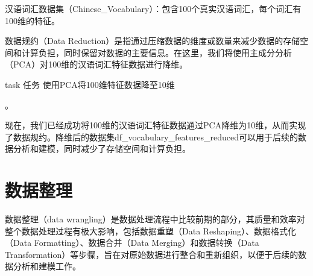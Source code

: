\documentclass[]{book}
\newenvironment{Shaded}{\begin{snugshade}}{\end{snugshade}}
\newcommand{\CommentTok}[1]{\textcolor[rgb]{0.56,0.35,0.01}{\textit{#1}}}
\newcommand{\DataTypeTok}[1]{\textcolor[rgb]{0.13,0.29,0.53}{#1}}
\newcommand{\DecValTok}[1]{\textcolor[rgb]{0.00,0.00,0.81}{#1}}
\newcommand{\KeywordTok}[1]{\textcolor[rgb]{0.13,0.29,0.53}{\textbf{#1}}}
\newcommand{\NormalTok}[1]{#1}
\newcommand{\OperatorTok}[1]{\textcolor[rgb]{0.81,0.36,0.00}{\textbf{#1}}}
\newcommand{\StringTok}[1]{\textcolor[rgb]{0.31,0.60,0.02}{#1}}
\begin{document}
汉语词汇数据集（Chinese\_Vocabulary）：包含100个真实汉语词汇，每个词汇有100维的特征。

数据规约（Data Reduction）是指通过压缩数据的维度或数量来减少数据的存储空间和计算负担，同时保留对数据的主要信息。在这里，我们将使用主成分分析（PCA）对100维的汉语词汇特征数据进行降维。

\begin{infobox}task
任务
使用PCA将100维特征数据降至10维

\end{infobox}

。

\begin{Shaded}
\end{Shaded}

现在，我们已经成功将100维的汉语词汇特征数据通过PCA降维为10维，从而实现了数据规约。降维后的数据集df\_vocabulary\_features\_reduced可以用于后续的数据分析和建模，同时减少了存储空间和计算负担。

\hypertarget{ux6570ux636eux6574ux7406}{%
\section{数据整理}\label{ux6570ux636eux6574ux7406}}

数据整理（data wrangling）是数据处理流程中比较前期的部分，其质量和效率对整个数据处理过程有极大影响，包括数据重塑（Data Reshaping）、数据格式化（Data Formatting）、数据合并（Data Merging）和数据转换（Data Transformation）等步骤，旨在对原始数据进行整合和重新组织，以便于后续的数据分析和建模工作。
\end{document}
